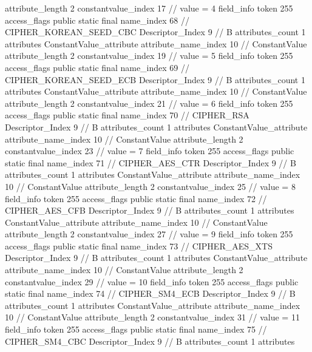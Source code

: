 {{{{{{{					attribute_length	2
					constantvalue_index	17		// value = 4
				}
				}
			}
			field_info {
				token	255
				access_flags	public static final
				name_index	68		// CIPHER_KOREAN_SEED_CBC
				Descriptor_Index	9		// B
				attributes_count	1
				attributes {
				ConstantValue_attribute {
					attribute_name_index	10		// ConstantValue
					attribute_length	2
					constantvalue_index	19		// value = 5
				}
				}
			}
			field_info {
				token	255
				access_flags	public static final
				name_index	69		// CIPHER_KOREAN_SEED_ECB
				Descriptor_Index	9		// B
				attributes_count	1
				attributes {
				ConstantValue_attribute {
					attribute_name_index	10		// ConstantValue
					attribute_length	2
					constantvalue_index	21		// value = 6
				}
				}
			}
			field_info {
				token	255
				access_flags	public static final
				name_index	70		// CIPHER_RSA
				Descriptor_Index	9		// B
				attributes_count	1
				attributes {
				ConstantValue_attribute {
					attribute_name_index	10		// ConstantValue
					attribute_length	2
					constantvalue_index	23		// value = 7
				}
				}
			}
			field_info {
				token	255
				access_flags	public static final
				name_index	71		// CIPHER_AES_CTR
				Descriptor_Index	9		// B
				attributes_count	1
				attributes {
				ConstantValue_attribute {
					attribute_name_index	10		// ConstantValue
					attribute_length	2
					constantvalue_index	25		// value = 8
				}
				}
			}
			field_info {
				token	255
				access_flags	public static final
				name_index	72		// CIPHER_AES_CFB
				Descriptor_Index	9		// B
				attributes_count	1
				attributes {
				ConstantValue_attribute {
					attribute_name_index	10		// ConstantValue
					attribute_length	2
					constantvalue_index	27		// value = 9
				}
				}
			}
			field_info {
				token	255
				access_flags	public static final
				name_index	73		// CIPHER_AES_XTS
				Descriptor_Index	9		// B
				attributes_count	1
				attributes {
				ConstantValue_attribute {
					attribute_name_index	10		// ConstantValue
					attribute_length	2
					constantvalue_index	29		// value = 10
				}
				}
			}
			field_info {
				token	255
				access_flags	public static final
				name_index	74		// CIPHER_SM4_ECB
				Descriptor_Index	9		// B
				attributes_count	1
				attributes {
				ConstantValue_attribute {
					attribute_name_index	10		// ConstantValue
					attribute_length	2
					constantvalue_index	31		// value = 11
				}
				}
			}
			field_info {
				token	255
				access_flags	public static final
				name_index	75		// CIPHER_SM4_CBC
				Descriptor_Index	9		// B
				attributes_count	1
				attributes {
}}}}}}
